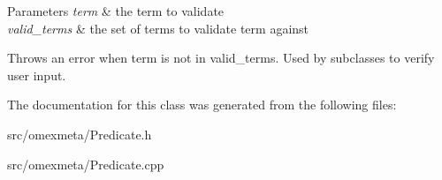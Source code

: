 \begin{DoxyParams}{Parameters}
{\em term} & the term to validate \\
\hline
{\em valid\+\_\+terms} & the set of terms to validate term against\\
\hline
\end{DoxyParams}
Throws an error when term is not in valid\+\_\+terms. Used by subclasses to verify user input. 

The documentation for this class was generated from the following files\+:\begin{DoxyCompactItemize}
\item 
src/omexmeta/Predicate.\+h\item 
src/omexmeta/Predicate.\+cpp\end{DoxyCompactItemize}
